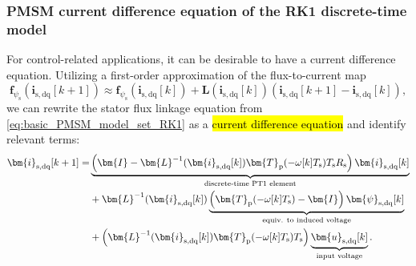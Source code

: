 \begin{frame}
    \frametitle{PMSM current difference equation of the RK1 discrete-time model}
    For control-related applications, it can be desirable to have a current difference equation. Utilizing a first-order approximation of the flux-to-current map
    \begin{equation}
        \bm{f}_{\psi_\mathrm{s}}(\bm{i}_\mathrm{s,dq}[k+1]) \approx \bm{f}_{\psi_\mathrm{s}}(\bm{i}_\mathrm{s,dq}[k]) +\bm{L}(\bm{i}_\mathrm{s,dq}[k])\left(\bm{i}_\mathrm{s,dq}[k+1] - \bm{i}_\mathrm{s,dq}[k]\right),
    \end{equation}\pause
    we can rewrite the stator flux linkage equation from \eqref{eq:basic_PMSM_model_set_RK1} as a \hl{current difference equation} and identify relevant terms:
    \begin{equation}
        \begin{split}
            \bm{i}_\mathrm{s,dq}[k+1]  = & \underbrace{\left(\bm{I} - \bm{L}^{-1}(\bm{i}_\mathrm{s,dq}[k]) \bm{T}_\mathrm{p}(-\omega[k]T_\mathrm{s})T_\mathrm{s}R_\mathrm{s}\right)\bm{i}_\mathrm{s,dq}[k]}_{\text{discrete-time PT1 element}}   \\
                                         & + \bm{L}^{-1}(\bm{i}_\mathrm{s,dq}[k])\underbrace{\left(\vphantom{\bm{L}^{-1}}\bm{T}_\mathrm{p}(-\omega[k]T_\mathrm{s})-\bm{I}\right)\bm{\psi}_{\mathrm{s,dq}}[k]}_{\text{equiv. to induced voltage}} \\
                                         & +\left( \bm{L}^{-1}(\bm{i}_\mathrm{s,dq}[k])\bm{T}_\mathrm{p}(-\omega[k]T_\mathrm{s}) T_\mathrm{s}\right)\underbrace{\bm{u}_{\mathrm{s,dq}}[k]}_{\text{input voltage}}.
        \end{split}
        \label{eq:current_diff_eq_RK1_alpha_beta}
    \end{equation}
\end{frame}

